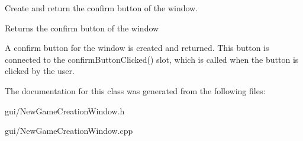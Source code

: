 Create and return the confirm button of the window. 

\begin{DoxyReturn}{Returns}
the confirm button of the window
\end{DoxyReturn}
A confirm button for the window is created and returned. This button is connected to the confirm\+Button\+Clicked() slot, which is called when the button is clicked by the user. 

The documentation for this class was generated from the following files\+:\begin{DoxyCompactItemize}
\item 
gui/New\+Game\+Creation\+Window.\+h\item 
gui/New\+Game\+Creation\+Window.\+cpp\end{DoxyCompactItemize}
